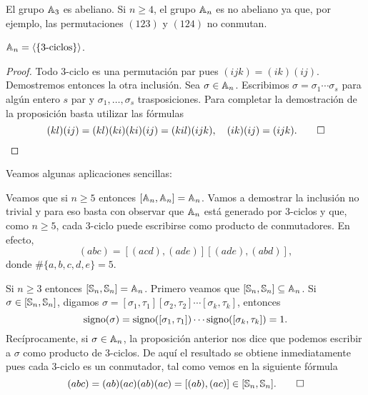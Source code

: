El grupo $\mathbb{A}_3$ es abeliano.   
Si $n\geq4$, el grupo $\mathbb{A}_n$ es no abeliano ya que, por ejemplo, las permutaciones $(123)$ y $(124)$ no conmutan.  


\begin{proposition}
\label{pro:A_n3ciclos}
$\mathbb{A}_n=\langle\{\text{3-ciclos}\}\rangle$. 
\end{proposition}

\begin{proof}
Todo 3-ciclo es una permutación par pues $(ijk)=(ik)(ij)$. Demostremos entonces la otra inclusión. Sea $\sigma\in\mathbb{A}_n$. 
Escribimos $\sigma=\sigma_1\cdots\sigma_s$ para algún entero $s$ par y $\sigma_1,\dots,\sigma_s$ trasposiciones. Para completar la demostración de la proposición
basta utilizar las fórmulas 
\[
(kl)(ij)=(kl)(ki)(ki)(ij)=(kil)(ijk),\quad
(ik)(ij)=(ijk).\qedhere
\]
 \end{proof}

Veamos algunas aplicaciones sencillas:

\begin{example}
Veamos que si $n\geq5$ entonces $[\mathbb{A}_n,\mathbb{A}_n]=\mathbb{A}_n$. Vamos a demostrar la inclusión no trivial y para eso basta con observar que $\mathbb{A}_n$ está generado por 3-ciclos y que, como $n\geq5$, cada 3-ciclo puede escribirse como producto de conmutadores. En efecto, 
\[
(abc)=[(acd),(ade)][(ade),(abd)],
\] 	
donde $\#\{a,b,c,d,e\}=5$. 
\end{example}

\begin{example}
Si $n\geq3$ entonces $[\mathbb{S}_n,\mathbb{S}_n]=\mathbb{A}_n$. Primero veamos que $[\mathbb{S}_n,\mathbb{S}_n]\subseteq\mathbb{A}_n$. Si $\sigma\in[\mathbb{S}_n,\mathbb{S}_n]$, 
digamos $\sigma=[\sigma_1,\tau_1][\sigma_2,\tau_2]\cdots[\sigma_k,\tau_k]$, entonces
\[
\operatorname{signo}(\sigma)=\operatorname{signo}([\sigma_1,\tau_1])\cdots\operatorname{signo}([\sigma_k,\tau_k])=1.
\]
Recíprocamente, si $\sigma\in\mathbb{A}_n$, la proposición anterior nos dice que podemos escribir a $\sigma$ como producto de 3-ciclos. De aquí el resultado se obtiene inmediatamente 
pues cada 3-ciclo es un conmutador, tal como vemos en la siguiente fórmula   	
\[
(abc)=(ab)(ac)(ab)(ac)=[(ab),(ac)]\in[\mathbb{S}_n,\mathbb{S}_n].\qedhere
\]
\end{example}
